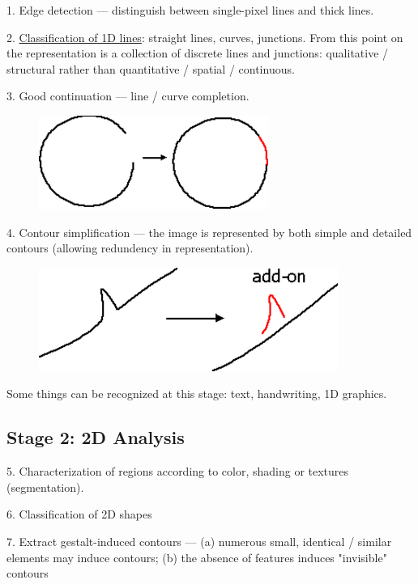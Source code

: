 1. Edge detection --- distinguish between single-pixel lines and thick lines.

2. \href{Vis-1DTaxonomy.htm}{Classification of 1D lines}: straight lines, curves, junctions. From this point on the representation is a collection of discrete lines and junctions: qualitative / structural rather than quantitative / spatial / continuous.

3. Good continuation --- line / curve completion.

\begin{figure}[H]
\centering
\includegraphics[scale=0.6]{GoodContinuation.png}
\end{figure}

4. Contour simplification --- the image is represented by both simple and detailed contours (allowing redundency in representation).

\begin{figure}[H]
\centering
\includegraphics[scale=0.6]{ContourSimplification.png}
\end{figure}

Some things can be recognized at this stage: text, handwriting, 1D graphics.

\subsection{Stage 2: 2D Analysis}

5. Characterization of regions according to color, shading or textures (segmentation).

6. Classification of 2D shapes

\underconst

7. Extract gestalt-induced contours --- (a) numerous small, identical / similar elements may induce contours; (b) the absence of features induces "invisible" contours

